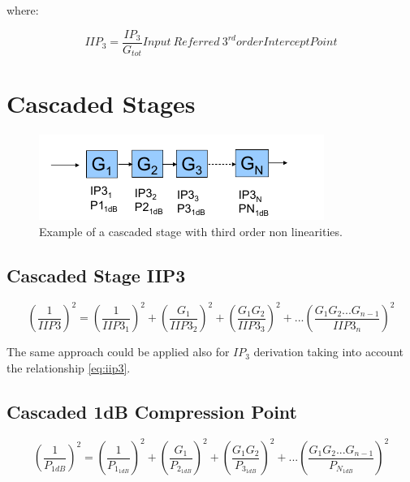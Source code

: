 where:

\begin{equation}
	IIP_3=\frac{IP_3}{G_{tot}} Input \ Referred \ 3^{rd} order Intercept Point
\end{equation}

\section{Cascaded Stages} %
\label{sec:cascaded_stages}

\begin{figure}[ht]
	\centering
	\includegraphics[scale=0.8]{Immagini/casip}
	\caption{Example of a cascaded stage with third order non linearities.}
	\label{fig:casip}
\end{figure}

\subsection{Cascaded Stage IIP3} %
\label{sec:cascaded_stage_iip3}


\begin{equation}
\left ( \frac {1} {IIP3} \right)^2 = \left( \frac {1} {IIP3_1}  \right)^2 + \left( \frac{G_1}{IIP3_2}  \right)^2 + \left( \frac {G_1G_2} {IIP3_3}  \right)^2 + ...\left( \frac {G_1G_2...G_{n-1}} {IIP3_n}  \right)^2
\end{equation}

The same approach could be applied also for $IP_3$ derivation taking into account the relationship \ref{eq:iip3}.

\subsection{Cascaded 1dB Compression Point}
\begin{equation}
\left ( \frac {1} {P_{1dB}} \right)^2 = \left( \frac {1} {P_{1_{1dB}}}  \right)^2 + \left( \frac{G_1}{P_{2_{1dB}}}  \right)^2 + \left( \frac {G_1G_2} {P_{3_{1dB}}}  \right)^2 + ...\left( \frac {G_1G_2...G_{n-1}} {P_{N_{1dB}}}  \right)^2
\end{equation}




